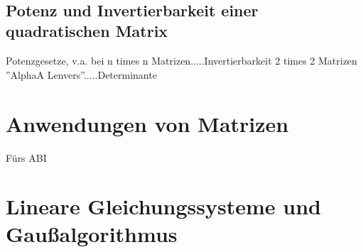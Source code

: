 \documentclass[../MAIN/main.tex]{subfiles}
\begin{document}
\\

\subsection{Potenz und Invertierbarkeit einer quadratischen Matrix}

Potenzgesetze, v.a. bei n times n Matrizen.....Invertierbarkeit 2 times 2 Matrizen ''AlphaA Lenvers''.....Determinante






	\section{Anwendungen von Matrizen}

Fürs ABI

	\section{Lineare Gleichungssysteme und Gaußalgorithmus}
\end{document}
